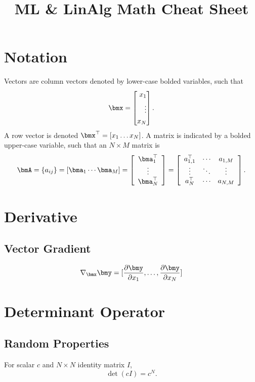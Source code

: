\documentclass[11pt]{article}
\title{ML \& LinAlg Math Cheat Sheet}
\begin{document}
\maketitle
\tableofcontents

\section{Notation}
Vectors are column vectors denoted by lower-case bolded variables, such that 
\[\bmx = \left[ \begin{split}
x_1 \\ \vdots \\ x_N 
\end{split} \right]. \]
A row vector is denoted $\bmx^\top = [x_1 \ldots x_N]$.
A matrix is indicated by a bolded upper-case variable, such that an $N \times M$ matrix is
\begin{align*}
\bmA = \{a_{ij}\} = [\bma_1 \cdots \bma_M ] =
\left[\begin{array}{c}
\bma_1^\top \\
\vdots \\
\bma_N^\top
\end{array}\right]
=
\left[\begin{array}{ccc}
a_{1,1}^\top & \cdots & a_{1, M} \\
\vdots & \ddots & \vdots \\
a_N^\top & \cdots & a_{N, M}
\end{array}\right].
\end{align*}

\section{Derivative}
\subsection{Vector Gradient}
\begin{equation}
\nabla_{\bmx} \bmy = [\frac{\partial \bmy}{\partial x_1}, \ldots, \frac{\partial \bmy}{\partial x_N}]
\label{eq:Derivative-random_vector}
\end{equation}

\section{Determinant Operator}
\subsection{Random Properties}
For scalar $c$ and $N\times N$ identity matrix $I$,
\[ \det(cI) = c^N. \]
\end{document}
